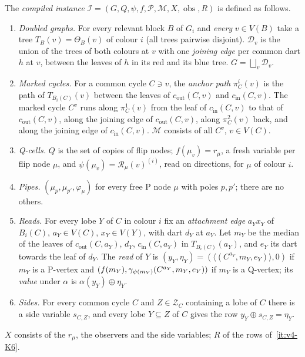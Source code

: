 \begin{definition}\label{def:v4-compiled}
The \emph{compiled instance} $\mathcal I=(G,Q,\psi,f,\mathcal P,\mathcal
M,X,\operatorname{obs},R)$ is defined as follows.
\begin{enumerate}[label=(K\arabic*),leftmargin=2.6em]
\item\label{it:v4-K1} \emph{Doubled graphs.} For every relevant block $B$ of
$G_i$ and \emph{every} $v\in V(B)$ take a tree $T_B(v)=\Theta_B(v)$ of colour
$i$ (all trees pairwise disjoint). $\mathcal D_v$ is the union of the trees
of both colours at $v$ with one \emph{joining edge} per common dart $h$ at $v$,
between the leaves of $h$ in its red and its blue tree. $G=\bigsqcup_v\mathcal
D_v$.
\item\label{it:v4-K2} \emph{Marked cycles.} For a common cycle $C\ni v$, the
\emph{anchor path} $\pi^i_C(v)$ is the path of $T_{B_i(C)}(v)$ between the
leaves of $c_{\mathrm{out}}(C,v)$ and $c_{\mathrm{in}}(C,v)$. The marked cycle
$C^v$ runs along $\pi^1_C(v)$ from the leaf of $c_{\mathrm{in}}(C,v)$ to that of
$c_{\mathrm{out}}(C,v)$, along the joining edge of $c_{\mathrm{out}}(C,v)$,
along $\pi^2_C(v)$ back, and along the joining edge of $c_{\mathrm{in}}(C,v)$.
$\mathcal M$ consists of all $C^v$, $v\in V(C)$.
\item\label{it:v4-K3} \emph{Q-cells.} $Q$ is the set of copies of flip
nodes; $f(\mu_v)=r_\mu$, a fresh variable per flip node $\mu$, and
$\psi(\mu_v)=\mathcal R_\mu(v)^{(i)}$, read on directions, for $\mu$ of colour
$i$.
\item\label{it:v4-K4} \emph{Pipes.} $(\mu_p,\mu_{p'},\varphi_\mu)$ for every
free P node $\mu$ with poles $p,p'$; there are no others.
\item\label{it:v4-K5} \emph{Reads.} For every lobe $Y$ of $C$ in colour $i$
fix an \emph{attachment edge} $a_Yx_Y$ of $B_i(C)$, $a_Y\in V(C)$, $x_Y\in
V(Y)$, with dart $d_Y$ at $a_Y$. Let $m_Y$ be the median of the leaves of
$c_{\mathrm{out}}(C,a_Y)$, $d_Y$, $c_{\mathrm{in}}(C,a_Y)$ in
$T_{B_i(C)}(a_Y)$, and $e_Y$ its dart towards the leaf of $d_Y$. The
\emph{read} of $Y$ is $(y_Y,\eta_Y)=(\langle(C^{a_Y},m_Y,e_Y)\rangle,0)$ if
$m_Y$ is a P-vertex and $(f(m_Y),\gamma_{\psi(m_Y)}(C^{a_Y},m_Y,e_Y))$ if
$m_Y$ is a Q-vertex; its \emph{value} under $\alpha$ is
$\alpha(y_Y)\oplus\eta_Y$.
\item\label{it:v4-K6} \emph{Sides.} For every common cycle $C$ and
$Z\in\mathcal Z_C$ containing a lobe of $C$ there is a side variable
$s_{C,Z}$, and every lobe $Y\subseteq Z$ of $C$ gives the row
$y_Y\oplus s_{C,Z}=\eta_Y$.
\end{enumerate}
$X$ consists of the $r_\mu$, the observers and the side variables; $R$ of the
rows of~\ref{it:v4-K6}.
\end{definition}

